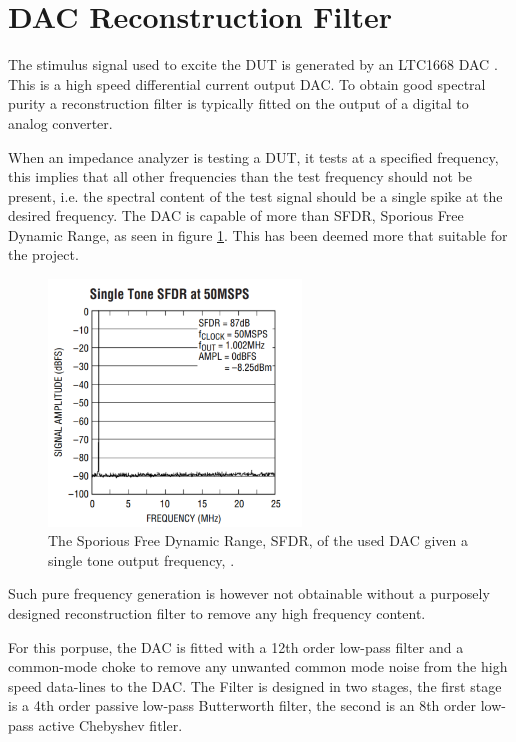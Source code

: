 \section{DAC Reconstruction Filter} \label{subsec:DAC_Power}
The stimulus signal used to excite the DUT is generated by an LTC1668 DAC \cite{DAC_LTC1668}. This is a high speed differential current output DAC. To obtain good spectral purity a reconstruction filter is typically fitted on the output of a digital to analog converter.

When an impedance analyzer is testing a DUT, it tests at a specified frequency, this implies that all other frequencies than the test frequency should not be present, i.e. the spectral content of the test signal should be a single spike at the desired frequency. The DAC is capable of more than  SFDR, Sporious Free Dynamic Range, as seen in figure \ref{fig_7_1_1_SFDR}. This has been deemed more that suitable for the project. 

\begin{figure}[H]
    \centering
    \includegraphics[clip, trim=0 0 0 0, width=0.6\textwidth]{Sections/7_SystemDesign/Figures/7_1_1_DAC_SingleTone_SFDR.pdf}
    \caption{The Sporious Free Dynamic Range, SFDR, of the used DAC given a single tone output frequency, \cite{DAC_LTC1668}.}
    \label{fig_7_1_1_SFDR}
\end{figure}

Such pure frequency generation is however not obtainable without a purposely designed reconstruction filter to remove any high frequency content.

For this porpuse, the DAC is fitted with a 12th order low-pass filter and a common-mode choke to remove any unwanted common mode noise from the high speed data-lines to the DAC. The Filter is designed in two stages, the first stage is a 4th order passive low-pass Butterworth filter, the second is an 8th order low-pass active Chebyshev fitler.

